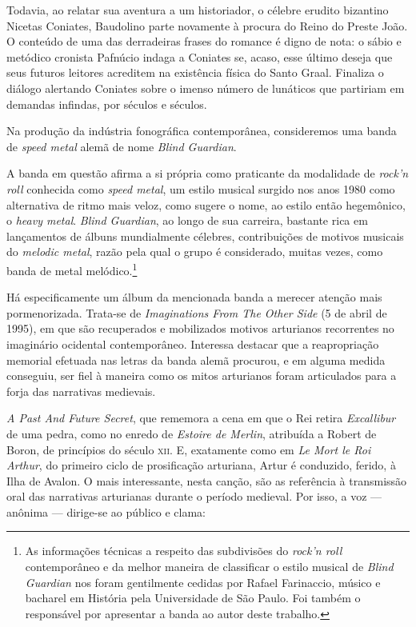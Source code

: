 Todavia, ao relatar sua aventura a um historiador, o célebre erudito
bizantino Nicetas Coniates, Baudolino parte novamente à procura do
Reino do Preste João. O conteúdo de uma das derradeiras frases do
romance é digno de nota: o sábio e metódico cronista Pafnúcio indaga a
Coniates se, acaso, esse último deseja que seus futuros leitores
acreditem na existência física do Santo Graal. Finaliza o diálogo
alertando Coniates sobre o imenso número de lunáticos que partiriam em
demandas infindas, por séculos e séculos.

Na produção da indústria fonográfica contemporânea, consideremos uma
banda de \textit{speed metal} alemã de nome \textit{Blind Guardian}. 

 A banda em questão afirma a si própria como praticante da modalidade de
\textit{rock’n roll} conhecida como \textit{speed metal}, um estilo
musical surgido nos anos 1980 como alternativa de ritmo mais veloz,
como sugere o nome, ao estilo então hegemônico, o \textit{heavy metal}.
\textit{Blind Guardian}, ao longo de sua carreira, bastante rica em
lançamentos de álbuns mundialmente célebres, contribuições de motivos
musicais do \textit{melodic metal}, razão pela qual o grupo é
considerado, muitas vezes, como banda de metal melódico.\footnote{ As
informações técnicas a respeito das subdivisões do \textit{rock’n roll}
contemporâneo e da melhor maneira de classificar o estilo musical de
\textit{Blind Guardian} nos foram gentilmente cedidas por Rafael
Farinaccio, músico e bacharel em História pela Universidade de São
Paulo. Foi também o responsável por apresentar a banda ao autor deste
trabalho.} 

Há especificamente um álbum da mencionada banda a merecer atenção mais
pormenorizada. Trata-se de \textit{Imaginations From The Other Side}
(5 de abril de 1995), em que são recuperados e mobilizados motivos
arturianos recorrentes no imaginário ocidental contemporâneo. Interessa
destacar que a reapropriação memorial efetuada nas letras da banda
alemã procurou, e em alguma medida conseguiu, ser fiel à maneira como
os mitos arturianos foram articulados para a forja das narrativas
medievais. 

\textit{A Past And Future Secret}, que rememora a cena em que o Rei
retira \textit{Excallibur} de uma pedra, como no enredo de
\textit{Estoire de Merlin}, atribuída a Robert de Boron, de princípios
do século \textsc{xii}. E, exatamente como em \textit{Le Mort le Roi Arthur}, do
primeiro ciclo de prosificação arturiana, Artur é conduzido, ferido, à
Ilha de Avalon. O mais interessante, nesta canção, são as referência à
transmissão oral das narrativas arturianas durante o período medieval.
Por isso, a voz --- anônima --- dirige-se ao público e clama:

